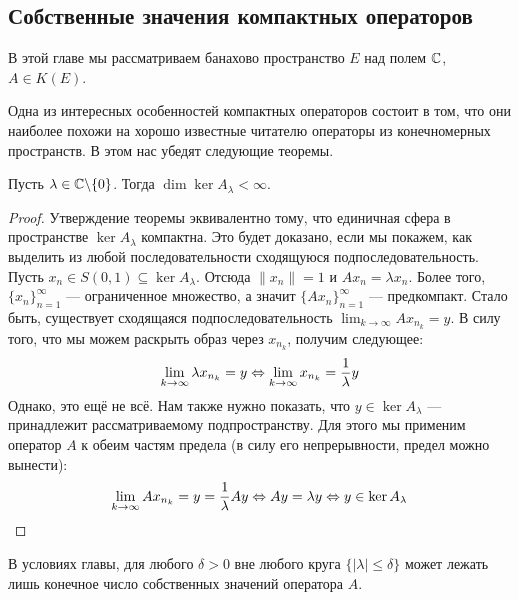 \subsection*{Собственные значения компактных операторов}

\begin{note}
	В этой главе мы рассматриваем банахово пространство $E$ над полем $\mathbb{C}$, $A \in K(E)$.
\end{note}

\begin{note}
	Одна из интересных особенностей компактных операторов состоит в том, что они наиболее похожи на хорошо известные читателю операторы из конечномерных пространств. В этом нас убедят следующие теоремы.
\end{note}

\begin{theorem} \label{compact_finite_dim}
	Пусть $\lambda \in \mathbb{C} \backslash \{0\}$. Тогда $\dim \ker A_\lambda < \infty$.
\end{theorem}

\begin{proof}
	Утверждение теоремы эквивалентно тому, что единичная сфера в пространстве $\ker A_\lambda$ компактна. Это будет доказано, если мы покажем, как выделить из любой последовательности сходящуюся подпоследовательность. Пусть $x_n \in S(0, 1) \subseteq \ker A_\lambda$. Отсюда $\|x_n\| = 1$ и $Ax_n = \lambda x_n$. Более того, $\{x_n\}_{n = 1}^\infty$ --- ограниченное множество, а значит $\{Ax_n\}_{n = 1}^\infty$ --- предкомпакт. Стало быть, существует сходящаяся подпоследовательность $\lim_{k \to \infty} Ax_{n_k} = y$. В силу того, что мы можем раскрыть образ через $x_{n_k}$, получим следующее:
	\[
		\lim_{k \to \infty} \lambda x_{n_k} = y \Leftrightarrow \lim_{k \to \infty} x_{n_k} = \frac{1}{\lambda}y
	\]
	Однако, это ещё не всё. Нам также нужно показать, что $y \in \ker A_\lambda$ --- принадлежит рассматриваемому подпространству. Для этого мы применим оператор $A$ к обеим частям предела (в силу его непрерывности, предел можно вынести):
	\[
		\lim_{k \to \infty} Ax_{n_k} = y = \frac{1}{\lambda} Ay \Leftrightarrow Ay = \lambda y \Leftrightarrow y \in \ker A_\lambda
	\]
\end{proof}

\begin{theorem}
	В условиях главы, для любого $\delta > 0$ вне любого круга $\{|\lambda| \le \delta\}$ может лежать лишь конечное число собственных значений оператора $A$.
\end{theorem}

